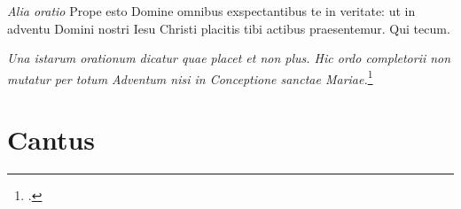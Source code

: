 \documentclass[a5paper, 12pt]{book}
\newcommand{\rubrica}[1]{\textit{#1}}
\newcommand{\cantus}[1]{%
  \phantomsection
  \label{can:#1}
  }
\begin{document}
\rubrica{Alia oratio}
Prope esto Domine omnibus exspectantibus te in veritate:
ut in adventu Domini nostri Iesu Christi placitis tibi actibus praesentemur.
Qui tecum.

\rubrica{Una istarum orationum dicatur quae placet et non plus.
  Hic ordo completorii non mutatur per totum Adventum
  nisi in Conceptione sanctae Mariae.}\footcite[83r-83v]{bp1502}

\section*{Cantus}

\cantus{adventus_quiventurus}

\printbibliography
\end{document}
